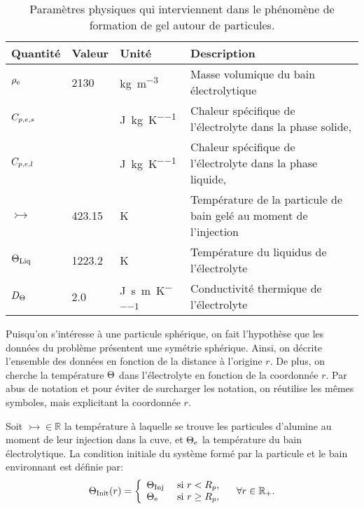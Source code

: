 \begin{table}
  \begin{center}
    \caption{Paramètres physiques qui interviennent dans le
      phénomène de formation de gel autour de particules.}
    \label{tab:freeze-physical-parameters}
  \begin{tabularx}{\textwidth}{@{}lllX@{}}
    \toprule
    Quantité          & Valeur     & Unité                           & Description \\
    \midrule
    $\rho_\mathrm{e}$         & \num{2130} & \si{\kg\per\cubic\meter}        & Masse volumique du bain électrolytique\\
    $C_{p,e,s}$ & \num{} & \si{\joule\per\kilo\gram\per\kelvin} & Chaleur spécifique de  l'électrolyte dans la phase solide,\\
    $C_{p,e,l}$ & \num{} & \si{\joule\per\kilo\gram\per\kelvin} & Chaleur spécifique de
    l'électrolyte dans la phase liquide,\\
    $\tinj$ & \num{423.15} & \si{\kelvin} & Température de la
    particule de bain gelé au moment de l'injection\\
    $\Theta_\text{Liq}$ & \num{1223.2} & \si{\kelvin} & Température du liquidus de
    l'électrolyte\\
    $D_\Theta$ & \num{2.0} & \si{\joule\per\second\per\meter\per\kelvin} & Conductivité thermique de l'électrolyte \\
    \bottomrule
  \end{tabularx}
\end{center}
\end{table}

Puisqu'on s'intéresse à une particule sphérique, on fait l'hypothèse
que les données du problème présentent une symétrie sphérique. Ainsi,
on décrite l'ensemble des données en fonction de la distance à
l'origine $r$. De plus, on cherche la température $\Theta$ dans
l'électrolyte en fonction de la coordonnée $r$. Par abus de notation
et pour éviter de surcharger les notation, on réutilise les mêmes
symboles, mais explicitant la coordonnée $r$.

Soit $\tinj\in\mathbb R$ la température à laquelle se trouve les
particules d'alumine au moment de leur injection dans la cuve, et
$\Theta_\mathrm{e}$ la température du bain électrolytique. La condition
initiale du système formé par la particule et le bain environnant est
définie par:
\begin{equation}
  \Theta_\text{Init}(r) = \left\{
  \begin{array}{ll}
    \Theta_\text{Inj} & \text{ si } r < R_p,\\
    \Theta_\mathrm{e} & \text{ si } r \geq R_p,\\
  \end{array}
  \right.\quad \forall r\in \mathbb R_+ .\label{eq:initial-temperature}
\end{equation}

